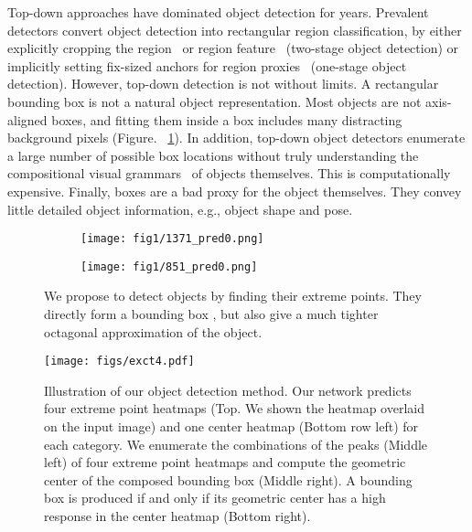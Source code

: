 \documentclass[10pt,twocolumn,letterpaper]{article}
\begin{document}
Top-down approaches have dominated object detection for years. 
Prevalent detectors convert object detection into rectangular region classification, by either explicitly cropping the region~\cite{girshick2014rich} or region feature~\cite{girshick2015fast,ren2015faster}  (two-stage object detection) or implicitly setting fix-sized anchors for region proxies~\cite{lin2018focal,redmon2016you,liu2016ssd} (one-stage object detection). 
However, top-down detection is not without limits.
A rectangular bounding box is not a natural object representation.
Most objects are not axis-aligned boxes, and fitting them inside a box includes many distracting background pixels (Figure. ~\ref{fig:oct}).
In addition, top-down object detectors enumerate a large number of possible box locations without truly understanding the compositional visual grammars~\cite{felzenszwalb2010object,girshick2011object} of objects themselves.
This is computationally expensive.
Finally, boxes are a bad proxy for the object themselves.
They convey little detailed object information, e.g., object shape and pose.

\begin{figure}[t]
\begin{subfigure}[b]{0.22\textwidth}
\begin{center}
   \texttt{[image: fig1/1371\_pred0.png]}
\end{center}
\end{subfigure} \hfill
\begin{subfigure}[b]{0.248\textwidth}
\begin{center}
   \texttt{[image: fig1/851\_pred0.png]}
\end{center}
\end{subfigure}
   \caption{We propose to detect objects by finding their extreme points. They directly form a bounding box , but also give a much tighter octagonal approximation of the object.}
\label{fig:oct}
\end{figure}




\begin{figure}[t]
\begin{center}
\texttt{[image: figs/exct4.pdf]}
\vspace{-1em}
\end{center}
   \caption{Illustration of our object detection method. Our network predicts four extreme point heatmaps (Top. We shown the heatmap overlaid on the input image) and one center heatmap (Bottom row left) for each category. We enumerate the combinations of the peaks (Middle left) of four extreme point heatmaps and compute the geometric center of the composed bounding box (Middle right). A bounding box is produced if and only if its geometric center has a high response in the center heatmap (Bottom right).}
\label{fig:group}
\end{figure}
\end{document}
